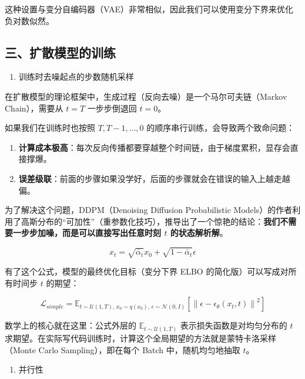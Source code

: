 这种设置与变分自编码器（VAE）非常相似，因此我们可以使用变分下界来优化负对数似然。

\hypertarget{ux4e09ux6269ux6563ux6a21ux578bux7684ux8badux7ec3}{%
\subsection{三、扩散模型的训练}\label{ux4e09ux6269ux6563ux6a21ux578bux7684ux8badux7ec3}}

\begin{enumerate}
\def\labelenumi{\arabic{enumi}.}
\tightlist
\item
  训练时去噪起点的步数随机采样
\end{enumerate}

在扩散模型的理论框架中，生成过程（反向去噪）是一个马尔可夫链（Markov Chain），需要从 \(t=T\) 一步步倒退回 \(t=0\)。

如果我们在训练时也按照 \(T,T-1,\ldots,0\) 的顺序串行训练，会导致两个致命问题：

\begin{enumerate}
\def\labelenumi{\arabic{enumi}.}
\tightlist
\item
  \textbf{计算成本极高}：每次反向传播都要穿越整个时间链，由于梯度累积，显存会直接撑爆。
\item
  \textbf{误差级联}：前面的步骤如果没学好，后面的步骤就会在错误的输入上越走越偏。
\end{enumerate}

为了解决这个问题，DDPM（Denoising Diffusion Probabilistic Models）的作者利用了高斯分布的``可加性''（重参数化技巧），推导出了一个惊艳的结论：\textbf{我们不需要一步步加噪，而是可以直接写出任意时刻 \(t\) 的状态解析解}。

\[
x_t=\sqrt{\bar{\alpha}_t}x_0+\sqrt{1-\bar{\alpha}_t}\epsilon
\]

有了这个公式，模型的最终优化目标（变分下界 ELBO 的简化版）可以写成对所有时间步 \(t\) 的期望：

\[
\mathcal{L}_{simple}
=\mathbb{E}_{t\sim\mathcal{U}(1,T),\,x_0\sim q(x_0),\,\epsilon\sim\mathcal{N}(0,I)}
\left[\left\|\epsilon-\epsilon_\theta(x_t,t)\right\|^2\right]
\]

数学上的核心就在这里：公式外层的 \(\mathbb{E}_{t\sim\mathcal{U}(1,T)}\) 表示损失函数是对均匀分布的 \(t\) 求期望。在实际写代码训练时，计算这个全局期望的方法就是蒙特卡洛采样（Monte Carlo Sampling），即在每个 Batch 中，随机均匀地抽取 \(t\)。

\begin{enumerate}
\def\labelenumi{\arabic{enumi}.}
\setcounter{enumi}{1}
\tightlist
\item
  并行性
\end{enumerate}

